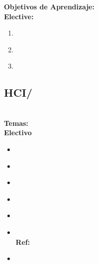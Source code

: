 \noindent \textbf{Objetivos de Aprendizaje:}\\
\noindent \textbf{Elective:}
\begin{enumerate}
	\setcounter{enumi}{0}
	\item \HCINewInteractiveTechnologiesLODescribeWhen\xspace[\HCINewInteractiveTechnologiesLODescribeWhenLevel]\label{sec:BOK:HCINewInteractiveTechnologiesLODescribeWhen}
	\item \HCINewInteractiveTechnologiesLOUnderstandThe\xspace[\HCINewInteractiveTechnologiesLOUnderstandTheLevel]\label{sec:BOK:HCINewInteractiveTechnologiesLOUnderstandThe}
	\item \HCINewInteractiveTechnologiesLODiscussTheDisadvantages\xspace[\HCINewInteractiveTechnologiesLODiscussTheDisadvantagesLevel]\label{sec:BOK:HCINewInteractiveTechnologiesLODiscussTheDisadvantages}
\end{enumerate}


\subsection{HCI/\HCICollaborationandcommunication}\label{sec:BOK:HCICollaborationandcommunication}
\HCICollaborationandcommunicationDescription\\
\noindent \textbf{Temas:}\\
\noindent \textbf{Electivo}
\begin{itemize}
	\item \HCICollaborationandcommunicationTopicAsynchronous\label{sec:BOK:HCICollaborationandcommunicationTopicAsynchronous}
	\item \HCICollaborationandcommunicationTopicSynchronous\label{sec:BOK:HCICollaborationandcommunicationTopicSynchronous}
	\item \HCICollaborationandcommunicationTopicSocial\label{sec:BOK:HCICollaborationandcommunicationTopicSocial}
	\item \HCICollaborationandcommunicationTopicOnline\label{sec:BOK:HCICollaborationandcommunicationTopicOnline}
	\item \HCICollaborationandcommunicationTopicOnlineCommunities\label{sec:BOK:HCICollaborationandcommunicationTopicOnlineCommunities}
	\item \HCICollaborationandcommunicationTopicSoftware\xspace \\ \textbf{Ref:} \label{sec:BOK:HCICollaborationandcommunicationTopicSoftware}
	\item \HCICollaborationandcommunicationTopicSocialPsychology\label{sec:BOK:HCICollaborationandcommunicationTopicSocialPsychology}
\end{itemize}


